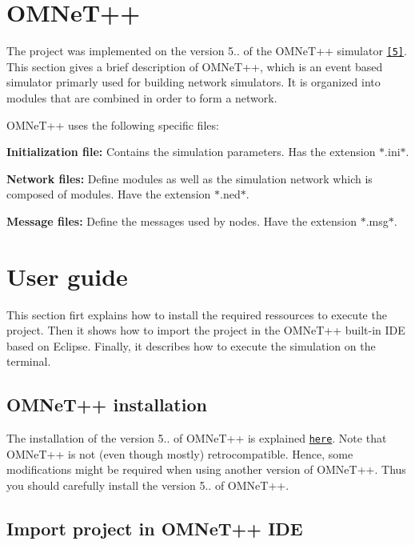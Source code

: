 \section*{O\+M\+Ne\+T++}

The project was implemented on the version 5.. of the O\+M\+Ne\+T++ simulator \href{https://omnetpp.org/}{\tt \mbox{[}5\mbox{]}}. This section gives a brief description of O\+M\+Ne\+T++, which is an event based simulator primarly used for building network simulators. It is organized into modules that are combined in order to form a network.

O\+M\+Ne\+T++ uses the following specific files\+:
\begin{DoxyEnumerate}
\item {\bfseries Initialization file\+:} Contains the simulation parameters. Has the extension $\ast$.ini$\ast$.
\item {\bfseries Network files\+:} Define modules as well as the simulation network which is composed of modules. Have the extension $\ast$.ned$\ast$.
\item {\bfseries Message files\+:} Define the messages used by nodes. Have the extension $\ast$.msg$\ast$.
\end{DoxyEnumerate}

\section*{User guide}

This section firt explains how to install the required ressources to execute the project. Then it shows how to import the project in the O\+M\+Ne\+T++ built-\/in I\+DE based on Eclipse. Finally, it describes how to execute the simulation on the terminal.

\subsection*{O\+M\+Ne\+T++ installation}

The installation of the version 5.. of O\+M\+Ne\+T++ is explained \href{https://doc.omnetpp.org/omnetpp5/InstallGuide.pdf}{\tt here}. Note that O\+M\+Ne\+T++ is not (even though mostly) retrocompatible. Hence, some modifications might be required when using another version of O\+M\+Ne\+T++. Thus you should carefully install the version 5.. of O\+M\+Ne\+T++.

\subsection*{Import project in O\+M\+Ne\+T++ I\+DE}

